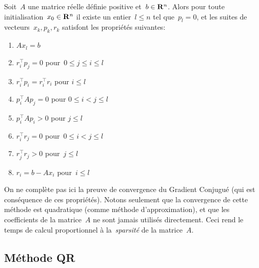 %

\begin{exercice}
	Soit~$A$ une matrice réelle définie positive et~$b\in\mathbf{R}^n$.   Alors pour
	toute initialisation~$x_0\in\mathbf{R}^n$ il existe un entier~$l\le n$ tel
	que~$p_l=0$, et les suites de vecteurs~$x_k,p_k,r_k$ satisfont les
	propriétés suivantes:
	\begin{enumerate}
		\item $Ax_l=b$
		\item $r_i^\top p_j=0$ pour~$0\le j\le i\le l$
		\item $r_i^\top p_i=r_i^\top r_i$ pour $i\le l$
		\item $p_i^\top A p_j=0$ pour $0\le i< j\le l$
		\item $p_i^\top A p_i>0$ pour $j\le l$
		\item $r_i^\top r_j=0$ pour~$0\le i< j\le l$
		\item $r_j^\top r_j>0$ pour~$j\le l$
		\item $r_i=b-Ax_i$ pour~$i\le l$
	\end{enumerate}
\end{exercice}

\begin{remark}
	On ne complète pas ici la preuve de convergence du Gradient Conjugué (qui
	est conséquence de ces propriétés).  Notons seulement que la convergence de
	cette méthode est quadratique (comme méthode d'approximation), et que les
	coefficients de la matrice~$A$ ne sont jamais utilisés directement.  Ceci
	rend le temps de calcul proportionnel à la~\emph{sparsité} de la
	matrice~$A$.
\end{remark}





\subsection{Méthode QR}

